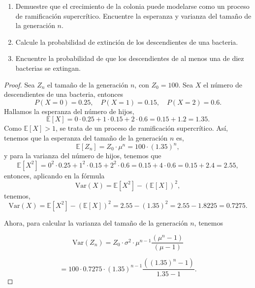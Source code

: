 \documentclass{article}
\begin{document}
\begin{enumerate}
    \item[(a)] Demuestre que el crecimiento de la colonia puede modelarse como un proceso de ramificación supercrítico. Encuentre la esperanza y varianza del tamaño de la generación \( n \).
    \item[(b)] Calcule la probabilidad de extinción de los descendientes de una bacteria.
    \item[(c)] Encuentre la probabilidad de que los descendientes de al menos una de diez bacterias se extingan.
\end{enumerate}

\begin{proof}
\item[(a)] Sea \( Z_n \) el tamaño de la generación \( n \), con \( Z_0 = 100 \). Sea \( X \) el número de descendientes de una bacteria, entonces
\[
P(X = 0) = 0.25, \quad P(X = 1) = 0.15, \quad P(X = 2) = 0.6.
\]
Hallamos la esperanza del número de hijos,
\[
\mathbb{E}[X] = 0 \cdot 0.25 + 1 \cdot 0.15 + 2 \cdot 0.6 = 0.15 + 1.2 = 1.35.
\]
Como \( \mathbb{E}[X] > 1 \), se trata de un proceso de ramificación supercrítico. Así, tenemos que la esperanza del tamaño de la generación \( n \) es,
\[
\mathbb{E}[Z_n] = Z_0 \cdot \mu ^n = 100 \cdot (1.35)^n,
\]
y para la varianza del número de hijos, tenemos que
\[
\mathbb{E}[X^2] = 0^2 \cdot 0.25 + 1^2 \cdot 0.15 + 2^2 \cdot 0.6 = 0.15 + 4 \cdot 0.6 = 0.15 + 2.4 = 2.55,
\]
entonces, aplicando en la fórmula 
\[
\mathrm{Var}(X) = \mathbb{E}[X^2] - (\mathbb{E}[X])^2,
\]
tenemos,
\[
\mathrm{Var}(X) = \mathbb{E}[X^2] - (\mathbb{E}[X])^2 = 2.55 - (1.35)^2 = 2.55 - 1.8225 = 0.7275.
\]

Ahora, para calcular la varianza del tamaño de la generación \( n \), tenemos

\[
\mathrm{Var}(Z_n) = Z_0 \cdot \sigma^2 \cdot \mu^{n-1}\frac{ (\mu^n - 1)}{(\mu - 1)} \]

\[=
100 \cdot 0.7275 \cdot (1.35)^{n-1} \frac{((1.35)^n - 1)}{1.35 -1}.
\]



\end{proof}
\end{document}
